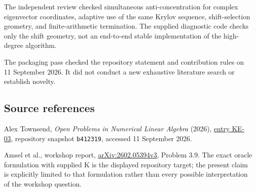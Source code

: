 \documentclass[10pt,a4paper]{article}
\begin{document}
The independent review checked simultaneous anti-concentration for
complex eigenvector coordinates, adaptive use of the same Krylov
sequence, shift-selection geometry, and finite-arithmetic termination.
The supplied diagnostic code checks only the shift geometry, not an
end-to-end stable implementation of the high-degree algorithm.

The packaging pass checked the repository statement and contribution
rules on 11 September 2026. It did not conduct a new exhaustive
literature search or establish novelty.

\subsection{Source references}\label{source-references}

Alex Townsend, \emph{Open Problems in Numerical Linear Algebra} (2026),
\href{https://github.com/ajt60gaibb/OpenProblemsInNLA/blob/b4123194697bdf6f8f82518c1dd7d6c40a30c2e0/eigenvalues-and-inverse-problems/KE-03/README.md}{entry
KE-03}, repository snapshot \texttt{b412319}, accessed 11 September
2026.

Amsel et al., workshop report,
\href{https://arxiv.org/abs/2602.05394v3}{arXiv:2602.05394v3}, Problem
3.9. The exact oracle formulation with supplied K is the displayed
repository target; the present claim is explicitly limited to that
formulation rather than every possible interpretation of the workshop
question.
\end{document}
